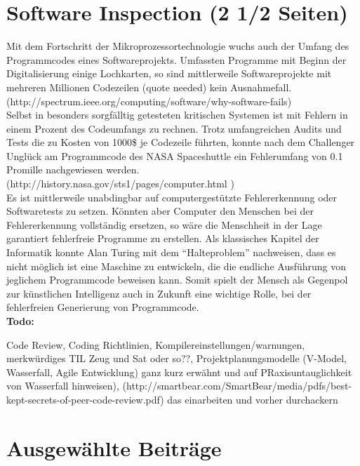 \documentclass[a4paper]{article}
\begin{document}



\section{Software Inspection (2 1/2 Seiten)}

Mit dem Fortschritt der Mikroprozessortechnologie wuchs auch der Umfang des Programmcodes eines Softwareprojekts. Umfassten Programme mit Beginn der Digitalisierung einige Lochkarten, so sind mittlerweile Softwareprojekte mit mehreren Millionen Codezeilen (quote needed) kein Ausnahmefall. (http://spectrum.ieee.org/computing/software/why-software-fails) \\  

Selbst in besonders sorgfälltig getesteten kritischen Systemen ist mit Fehlern in einem Prozent des Codeumfangs zu rechnen. Trotz umfangreichen Audits und Tests die zu Kosten von 1000\$ je Codezeile führten, konnte nach dem Challenger Unglück  am Programmcode des NASA Spaceshuttle  ein Fehlerumfang von 0.1 Promille nachgewiesen werden. (http://history.nasa.gov/sts1/pages/computer.html ) \\

Es ist mittlerweile unabdingbar auf computergestützte Fehlererkennung oder Softwaretests zu setzen. Könnten aber Computer den Menschen bei der Fehlererkennung vollständig ersetzen, so wäre die Menschheit in der Lage garantiert fehlerfreie Programme zu erstellen. Als klassisches Kapitel der Informatik konnte Alan Turing mit dem “Halteproblem” nachweisen, dass es nicht möglich ist eine Maschine zu entwickeln, die die endliche Ausführung von jeglichem Programmcode beweisen kann. Somit spielt der Mensch als Gegenpol zur künstlichen Intelligenz auch in Zukunft eine wichtige Rolle, bei der fehlerfreien Generierung von Programmcode. \\

\textbf{Todo:}

Code Review, Coding Richtlinien, Kompilereinstellungen/warnungen, merkwürdiges TIL Zeug und Sat oder so??,
Projektplanungsmodelle (V-Model, Wasserfall, Agile Entwicklung) ganz kurz erwähnt und auf PRaxisuntauglichkeit von Wasserfall hinweisen), (http://smartbear.com/SmartBear/media/pdfs/best-kept-secrets-of-peer-code-review.pdf) das einarbeiten und vorher durchackern





\section{Ausgewählte Beiträge}
\end{document}
